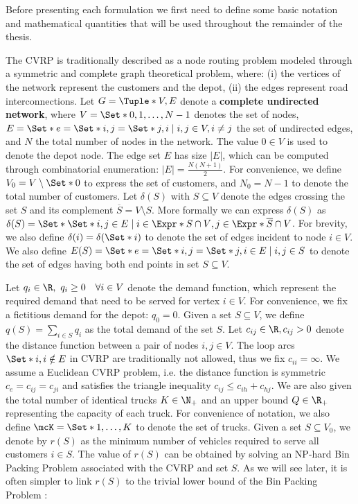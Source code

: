 Before presenting each formulation we first need to define some basic notation
and mathematical quantities that will be used throughout the remainder of the thesis.

\medskip

The CVRP is traditionally described as a node routing problem modeled through a symmetric and complete graph theoretical problem,
where: (i) the vertices of the network represent the customers and the depot,
(ii) the edges represent road interconnections.
Let $G = \Tuple*{V, E}$ denote a \textbf{complete undirected network}, where $V = \Set*{0, 1, \dots, N - 1}$ denotes the set of nodes,
$E = \Set*{e = \Set*{i, j} = \Set*{j, i} \mid \allowbreak i,j \in V, \allowbreak i \ne j}$ the set of undirected edges,
and $N$ the total number of nodes in the network.
The value $0 \in V$ is used to denote the depot node.
The edge set $E$ has size $|E|$, which can be computed through combinatorial enumeration: $|E| = \frac{N (N+1)}{2}$.
For convenience, we define $V_0 = V \setminus \Set*{0}$ to express the set of customers,
and $N_0 = N - 1$ to denote the total number of customers.
Let $\delta(S)$ with $S \subseteq V$ denote the edges crossing the set $S$ and its complement $\overline{S} = V \setminus S$.
More formally we can express $\delta(S)$ as $\delta(S) = \Set*{ \Set*{i, j} \in E \mid i \in \Expr*{S \cap V}, j \in \Expr*{ \overline{S} \cap V } }$.
For brevity, we also define $\delta(i) = \delta(\Set*{i})$ to denote the set of edges incident to node $i \in V$.
We also define $E(S) = \Set*{e = \Set*{i, j} = \Set*{j, i}\in E \mid i, j \in S}$ to denote the set of edges having both end points in set $S \subseteq V$.

Let $q_{i} \in \R,\ q_{i} \ge 0 \quad \forall i \in V$ denote the demand function, which represent the required demand that need to be served for vertex $i \in V$.
For convenience, we fix a fictitious demand for the depot: $q_0 = 0$.
Given a set $S \subseteq V$, we define $q(S) = \sum_{i \in S} q_i$ as the total demand of the set $S$.
Let $c_{ij} \in \R, c_{ij} > 0$ denote the distance function between a pair of nodes  $i, j \in V$.
The loop arcs $\Set*{i, i} \notin E$ in CVRP are traditionally not allowed, thus we fix $c_{ii} = \infty$.
We assume a Euclidean CVRP problem, i.e. the distance function is symmetric $c_e = c_{ij} = c_{ji}$ and satisfies the triangle inequality $c_{ij} \le c_{ih} + c_{hj}$.
We are also given the total number of identical trucks $K \in \N_+$ and an upper bound $Q \in \R_+$ representing the capacity of each truck.
For convenience of notation, we also define $\mcK = \Set*{1, \dots, K}$ to denote the set of trucks.
Given a set $S \subseteq V_0$, we denote by $r(S)$ as the minimum number of vehicles required to serve all customers $i \in S$.
The value of $r(S)$ can be obtained by solving an NP-hard Bin Packing Problem associated with the CVRP and set $S$.
As we will see later, it is often simpler to link $r(S)$ to the trivial lower bound of the Bin Packing Problem \parencite{martello1990}:

